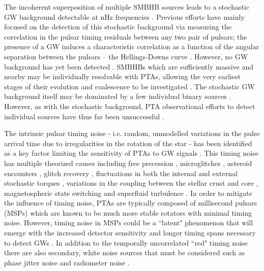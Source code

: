 \documentclass[fleqn,usenatbib,useAMS]{mnras}
\begin{document}
The incoherent superposition of multiple SMBHB sources leads to a stochastic GW background detectable at nHz frequencies \citep{Allen1997,Sesana10,Christensen2019,Renzini2022}. Previous efforts have mainly focused on the detection of this stochastic background via measuring the correlation in the pulsar timing residuals between any two pair of pulsars; the presence of a GW induces a characteristic correlation as a function of the angular separation between the pulsars -- the Hellings-Downs curve \citep{Hellings}. However, no GW background has yet been detected \citep{Lentati2015,NanoGrav2018,2022MNRAS.510.4873A}. SMBHBs which are sufficiently massive and nearby may be individually resolvable with PTAs, allowing the very earliest stages of their evolution and coalescence to be investigated \citep{Sesana2010,Zhu10,Babak2012,2013CQGra..30v4004E,Zhupulsarterms}. 
The stochastic GW background itself may be dominated by a few individual binary sources \citep{Ravi2012singlesource}. However, as with the stochastic background, PTA observational efforts to detect individual sources have thus far been unsuccessful \citep{Zhu2014PPTA,Babak2016,Arzoumanian2023}. \newline 




The intrinsic pulsar timing noise - i.e.  random, unmodelled variations in the pulse arrival time due to irregularities in the rotation of the star - has been identified as a key factor limiting the sensitivity of PTAs to GW signals \citep{Shannon2010,Lasky2015,Caballero2016}. This timing noise has multiple theorized causes including free precession \citep{free_precession_kerr,stairs_freeprecession}, microglitches \citep{Alessandro1995,Melatos2008,Espinoza2021}, asteroid encounters \citep{Shannon_2013,Brook_2014}, glitch recovery \citep{Johnston10,Hobbs2010glitch}, fluctuations in both the internal and external stochastic torques \citep{Cordes1981, 2006MNRAS.370L..76U,Antonelli2023}, variations in the coupling between the stellar crust and core \citep{Jones1990MNRAS.246..364J}, magnetospheric state switching \citep{magneto1,Lyne2010L} and superfluid turbulence \citep{Link10.111,Melatos2014}. In order to mitigate the influence of timing noise, PTAs are typically composed of millisecond pulsars (MSPs) which are known to be much more stable rotators with minimal timing noise. However, timing noise in MSPs could be a ``latent" phenomenon that will emerge with the increased detector sensitivity and longer timing spans necessary to detect GWs \citep{Shannon2010}. In addition to the temporally uncorrelated ``red" timing noise there are also secondary, white noise sources that must be considered such as phase jitter noise and radiometer noise \citep{Cordes2010,Lam2019,Parthasarathy2021}. \newline 
\end{document}
